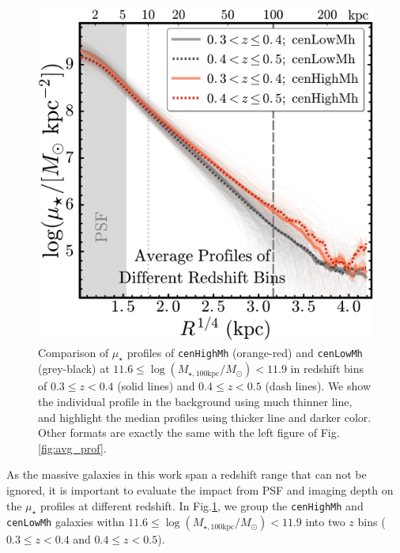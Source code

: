 \documentclass{emulateapj}
\def\rbcg{\texttt{cenHighMh}}
\def\nbcg{\texttt{cenLowMh}}
\def\logmtot{{$\log (M_{\star,100\mathrm{kpc}}/M_{\odot})$}}
\def\mden{{$\mu_{\star}$}}
\newcommand{\update}[1]{\textcolor{Bittersweet}{#1}}
\begin{document}
\begin{CJK*}{UTF8}{gbsn}
\begin{figure}[tb!]
    \centering 
    \includegraphics[width=13.0cm]{fig/redbcg_avg_prof_z}
    \caption{Comparison of \mden{} profiles of \rbcg{} (orange-red) and \nbcg{} 
        (grey-black) at $11.6 \le$\logmtot$< 11.9$ in redshift bins of 
        $0.3\leq z<0.4$ (solid lines) and $0.4\leq z<0.5$ (dash lines). 
        We show the individual profile in the background using much thinner line, 
        and highlight the median profiles using thicker line and darker color.
        Other formats are exactly the same with the left figure of 
        Fig.\ref{fig:avg_prof}.}
    \label{fig:avg_prof_z}
\end{figure}    
    
    \update{
    As the massive galaxies in this work span a redshift range that can not be ignored, 
    it is important to evaluate the impact from PSF and imaging depth on the \mden{} 
    profiles at different redshift. 
    In Fig.\ref{fig:avg_prof_z}, we group the \rbcg{} and \nbcg{} galaxies withn 
    $11.6 \le$\logmtot$< 11.9$ into two $z$ bins ($0.3\leq z<0.4$ and $0.4\leq z<0.5$). 
    }


\end{CJK*}
\end{document}
